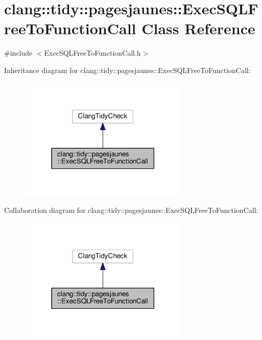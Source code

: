 \hypertarget{classclang_1_1tidy_1_1pagesjaunes_1_1_exec_s_q_l_free_to_function_call}{}\section{clang\+:\+:tidy\+:\+:pagesjaunes\+:\+:Exec\+S\+Q\+L\+Free\+To\+Function\+Call Class Reference}
\label{classclang_1_1tidy_1_1pagesjaunes_1_1_exec_s_q_l_free_to_function_call}


{\ttfamily \#include $<$Exec\+S\+Q\+L\+Free\+To\+Function\+Call.\+h$>$}



Inheritance diagram for clang\+:\+:tidy\+:\+:pagesjaunes\+:\+:Exec\+S\+Q\+L\+Free\+To\+Function\+Call\+:
\nopagebreak
\begin{figure}[H]
\begin{center}
\leavevmode
\includegraphics[width=230pt]{classclang_1_1tidy_1_1pagesjaunes_1_1_exec_s_q_l_free_to_function_call__inherit__graph}
\end{center}
\end{figure}


Collaboration diagram for clang\+:\+:tidy\+:\+:pagesjaunes\+:\+:Exec\+S\+Q\+L\+Free\+To\+Function\+Call\+:
\nopagebreak
\begin{figure}[H]
\begin{center}
\leavevmode
\includegraphics[width=230pt]{classclang_1_1tidy_1_1pagesjaunes_1_1_exec_s_q_l_free_to_function_call__coll__graph}
\end{center}
\end{figure}
